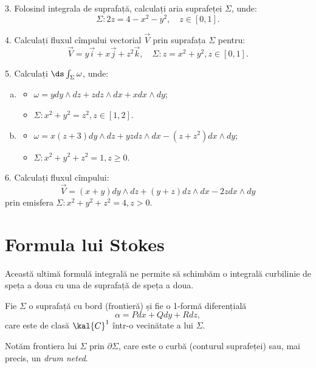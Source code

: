 3. Folosind integrala de suprafață, calculați aria suprafeței $ \Sigma $, unde:
\[
  \Sigma : 2z = 4 - x^2 - y^2, \quad z \in [0, 1].
\]

\vspace{1cm}

4. Calculați fluxul cîmpului vectorial $ \vec{V} $ prin suprafața $ \Sigma $
pentru:
\[
  \vec{V} = y\vec{i} + x\vec{j} + z^2 \vec{k}, \quad %
  \Sigma : z = x^2 + y^2, z \in [0, 1].
\]

\vspace{1cm}

5. Calculați $ \ds\int_\Sigma \omega $, unde:
\begin{enumerate}[(a)]
\item
  \begin{itemize}
  \item $ \omega = y dy \wedge dz + z dz \wedge dx + x dx \wedge dy $;
  \item $ \Sigma : x^2 + y^2 = z^2, z \in [1, 2] $.
  \end{itemize}
\item
  \begin{itemize}
  \item $ \omega = x(z + 3) dy \wedge dz + yz dz \wedge dx - %
    (z + z^2) dx \wedge dy $;
  \item $ \Sigma : x^2 + y^2 + z^2 = 1, z \geq 0 $.
  \end{itemize}
\end{enumerate}

\vspace{1cm}

6. Calculați fluxul cîmpului:
\[
  \vec{V} = (x + y) dy \wedge dz + (y + z) dz \wedge dx -2z dx \wedge dy
\]
prin emisfera $ \Sigma: x^2 + y^2 + z^2 = 4, z > 0 $.


\section{Formula lui Stokes}
Această ultimă formulă integrală ne permite să schimbăm o integrală curbilinie
de speța a doua cu una de suprafață de speța a doua.

Fie $ \Sigma $ o suprafață cu bord (frontieră) și fie o 1-formă diferențială
\[
  \alpha = Pdx + Qdy + Rdz,
\]
care este de clasă $ \kal{C}^1 $ într-o vecinătate a lui $ \Sigma $.

Notăm frontiera lui $ \Sigma $ prin $ \partial \Sigma $, care este o
curbă (conturul suprafeței) sau, mai precis, un \emph{drum neted}.

